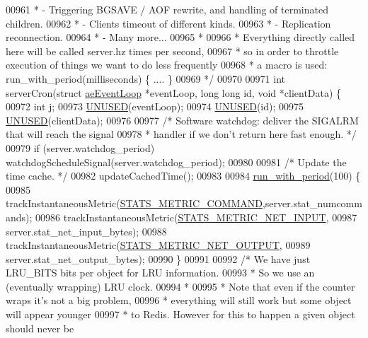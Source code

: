 \begin{DoxyCode}
{{{{{00961 \textcolor{comment}{ * - Triggering BGSAVE / AOF rewrite, and handling of terminated children.}
00962 \textcolor{comment}{ * - Clients timeout of different kinds.}
00963 \textcolor{comment}{ * - Replication reconnection.}
00964 \textcolor{comment}{ * - Many more...}
00965 \textcolor{comment}{ *}
00966 \textcolor{comment}{ * Everything directly called here will be called server.hz times per second,}
00967 \textcolor{comment}{ * so in order to throttle execution of things we want to do less frequently}
00968 \textcolor{comment}{ * a macro is used: run\_with\_period(milliseconds) \{ .... \}}
00969 \textcolor{comment}{ */}
00970 
00971 \textcolor{keywordtype}{int} serverCron(\textcolor{keyword}{struct} \hyperlink{structaeEventLoop}{aeEventLoop} *eventLoop, \textcolor{keywordtype}{long} \textcolor{keywordtype}{long} id, \textcolor{keywordtype}{void} *clientData) \{
00972     \textcolor{keywordtype}{int} j;
00973     \hyperlink{server_8h_ae7c9dc8f13568a9c856573751f1ee1ec}{UNUSED}(eventLoop);
00974     \hyperlink{server_8h_ae7c9dc8f13568a9c856573751f1ee1ec}{UNUSED}(id);
00975     \hyperlink{server_8h_ae7c9dc8f13568a9c856573751f1ee1ec}{UNUSED}(clientData);
00976 
00977     \textcolor{comment}{/* Software watchdog: deliver the SIGALRM that will reach the signal}
00978 \textcolor{comment}{     * handler if we don't return here fast enough. */}
00979     \textcolor{keywordflow}{if} (server.watchdog\_period) watchdogScheduleSignal(server.watchdog\_period);
00980 
00981     \textcolor{comment}{/* Update the time cache. */}
00982     updateCachedTime();
00983 
00984     \hyperlink{server_8h_aeb204872adbaabc0bd56c64f562b7928}{run\_with\_period}(100) \{
00985         trackInstantaneousMetric(\hyperlink{server_8h_ac8d50898802f96b76479bc975e1bbbf3}{STATS\_METRIC\_COMMAND},server.stat\_numcommands);
00986         trackInstantaneousMetric(\hyperlink{server_8h_a6d217560ae714ab8d0cc21832b210e0b}{STATS\_METRIC\_NET\_INPUT},
00987                 server.stat\_net\_input\_bytes);
00988         trackInstantaneousMetric(\hyperlink{server_8h_a3885f356f3a4cef22eb96fbfcc406333}{STATS\_METRIC\_NET\_OUTPUT},
00989                 server.stat\_net\_output\_bytes);
00990     \}
00991 
00992     \textcolor{comment}{/* We have just LRU\_BITS bits per object for LRU information.}
00993 \textcolor{comment}{     * So we use an (eventually wrapping) LRU clock.}
00994 \textcolor{comment}{     *}
00995 \textcolor{comment}{     * Note that even if the counter wraps it's not a big problem,}
00996 \textcolor{comment}{     * everything will still work but some object will appear younger}
00997 \textcolor{comment}{     * to Redis. However for this to happen a given object should never be}
}}}}}
\end{DoxyCode}
